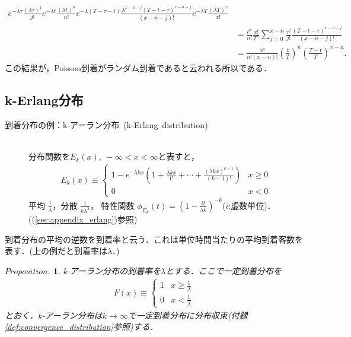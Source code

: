 \documentclass[a4j,papersize,disablejfam,slide,14pt]{jsarticle}
\newtheorem{Prop}{$Proposition.$}
\def\exp#1{e^{#1}} %
\begin{document}
\begin{description}
\begin{align}
{                	\exp{-\lambda \tau} \frac{(\lambda \tau)^j}{j!} 
                    \exp{-\lambda t} \frac{(\lambda t)^n}{n!} 
                    \exp{-\lambda (T - \tau - t)} \frac{\lambda^{x-n-j} (T - t - \tau)^{x-n-j}}{(x-n-j)!}}{\exp{-\lambda T} \frac{(\lambda T)^x}{x!}} \\
                &= \frac{t^n}{n!} \frac{x!}{T^x} \sum_{j=0}^{x-n} \frac{\tau^j}{j!} \frac{(T - t - \tau)^{x-n-j}}{(x-n-j)!} \\
                &= \frac{x!}{n!(x-n)!} \left( \frac{t}{T} \right)^n \left( \frac{T-t}{T} \right)^{x-n}.
            \end{align}
            この結果が，{\rm Poisson}到着がランダム到着であると云われる所以である．
    \end{description}
    
\subsection{{\rm k-Erlang}分布}
	\begin{description}
    	\item[到着分布の例：{\rm k-}アーラン分布\ {\rm (k-Erlang\ distribution)}]\mbox{}\\
    		分布関数を$E_k(x),\ -\infty < x < \infty$と表すと，
    		\begin{align}
    			E_k(x) \equiv
        		\begin{cases}
        			1 - \exp{-\lambda k x} \left( 1 + \frac{\lambda k x}{1!} + \cdots + \frac{(\lambda k x)^{k-1}}{(k-1)!} \right) & \text{$x \geq 0$}\\
    				0 & \text{$x < 0$}
        		\end{cases}
    		\end{align}
            平均 $\frac{1}{\lambda}$，分散 $\frac{1}{k\lambda^2}$，
            特性関数 $\phi_{E_k}(t) = \left( 1 - \frac{it}{\lambda k} \right)^{-k}$($i$:虚数単位)．((\ref{sec:appendix_erlang})参照)
    \end{description}
    到着分布の平均の逆数を到着率と云う．これは単位時間当たりの平均到着客数を表す．(上の例だと到着率は$\lambda$．) \\
	\begin{screen}
    	\begin{Prop}
        	{\rm k-}アーラン分布の到着率を$\lambda$とする．ここで一定到着分布を
            \begin{align}
            	F(x) \equiv
                \begin{cases}
                	1 & \text{$x \geq \frac{1}{\lambda}$}\\
                    0 & \text{$x < \frac{1}{\lambda}$}
                \end{cases}
            \end{align}
            とおく．{\rm k-}アーラン分布は$k \rightarrow \infty$で一定到着分布に分布収束(付録\ref{def:convergence_distribution}参照)する．
        \end{Prop}
    \end{screen}
\end{document}
